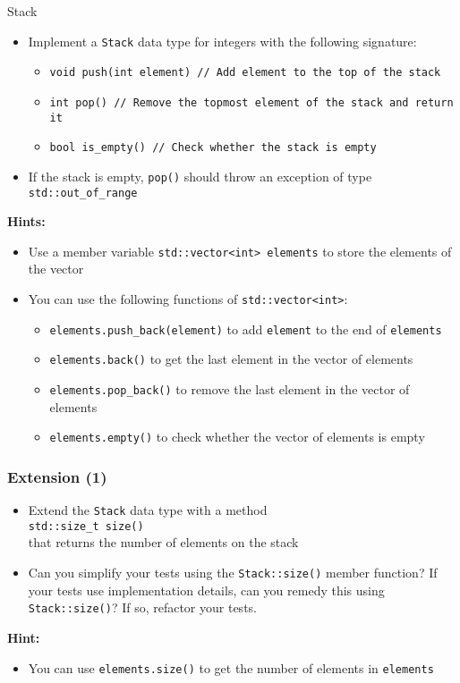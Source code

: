\documentclass[10pt,aspectratio=169]{beamer}
\begin{document}
\begin{frame}[fragile]{Stack}
  \begin{itemize}
    \item Implement a \texttt{Stack} data type for integers with the
          following signature:
          \begin{itemize}
            \item \texttt{void push(int element) // Add element to the top of the stack}
            \item \texttt{int pop() // Remove the topmost element of the stack and
                    return it }
            \item \verb!bool is_empty() // Check whether the stack is empty!
          \end{itemize}
    \item If the stack is empty, \texttt{pop()} should throw an exception
          of type \verb!std::out_of_range!
  \end{itemize}
  \textbf{Hints:}
  \begin{itemize}
    \item Use a member variable \verb|std::vector<int> elements| to store the
          elements of the vector
    \item You can use the following functions of \verb|std::vector<int>|:
          \begin{itemize}
            \item \verb|elements.push_back(element)| to add \verb|element| to the end of
                  \verb|elements|
            \item \verb|elements.back()| to get the last element in the vector of elements
            \item \verb|elements.pop_back()| to remove the last element in the vector of elements
            \item \verb|elements.empty()| to check whether the vector of elements is
                  empty
          \end{itemize}
  \end{itemize}
\end{frame}

\begin{frame}[fragile]
  \frametitle{Extension (1)}
  \begin{itemize}
    \item Extend the \texttt{Stack} data type with a method\\[1ex]
          \verb!std::size_t size()!\\[1ex]
          that returns the number of elements on the stack
    \item Can you simplify your tests using the \verb|Stack::size()| member
          function? If your tests use implementation details, can you remedy this
          using \verb|Stack::size()|? If so, refactor your tests.
  \end{itemize}
  \textbf{Hint:}
  \begin{itemize}
    \item You can use \verb|elements.size()| to get the number of elements in
          \verb|elements|
  \end{itemize}
\end{frame}
\end{document}
